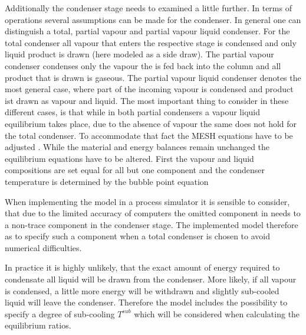         Additionally the condenser stage needs to examined a little further. In terms of operations
        several assumptions can be made for the condenser. In general one can distinguish a total,
        partial vapour and partial vapour liquid condenser. For the total condenser all vapour that
        enters the respective stage is condensed and only liquid product is drawn (here modeled as
        a side draw). The partial vapour condenser condenses only the vapour the is fed back into
        the column and all product that is drawn is gaseous. The partial vapour liquid condenser
        denotes the most general case, where part of the incoming vapour is condensed and product
        ist drawn as vapour and liquid. The most important thing to consider in these different cases,
        is that while in both partial condensers a vapour liquid equilibrium takes place, due to the
        absence of vapour the same does not hold for the total condenser. To accommodate that fact
        the MESH equations have to be adjusted \cite{Naphtali.1971}. While the material and energy
        balances remain unchanged the equilibrium equations have to be altered. First the vapour and
        liquid compositions are set equal for all but one component
        and the condenser temperature is determined by the bubble point equation

        When implementing the model in a process simulator it is sensible to consider, that due to
        the limited accuracy of computers the omitted component in  needs to
        a non-trace component in the condenser stage. The implemented model therefore as to specify
        such a component when a total condenser is chosen to avoid numerical difficulties.

        In practice it is highly unlikely, that the exact amount of energy required to condensate all
        liquid will be drawn from the condenser. More likely, if all vapour is condensed, a little more
        energy will be withdrawn and slightly sub-cooled liquid will leave the condenser. Therefore
        the model includes the possibility to specify a degree of sub-cooling $T^{sub}$ which will be
        considered when calculating the equilibrium ratios.



